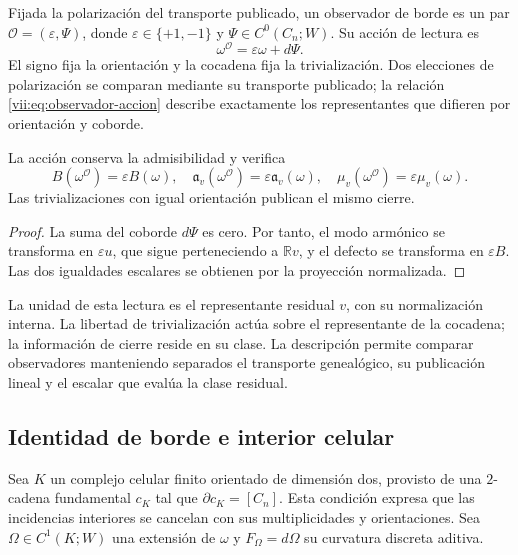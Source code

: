 \begin{definition}
\label{vii:def:observador-borde}
Fijada la polarización del transporte publicado, un observador de borde
es un par \(\mathcal O=(\varepsilon,\Psi)\), donde
\(\varepsilon\in\{+1,-1\}\) y \(\Psi\in C^0(C_n;W)\).
Su acción de lectura es
\begin{equation}
 \omega^{\mathcal O}=\varepsilon\omega+d\Psi.
 \label{vii:eq:observador-accion}
\end{equation}
El signo fija la orientación y la cocadena fija la trivialización.
Dos elecciones de polarización se comparan mediante su transporte
publicado; la relación \eqref{vii:eq:observador-accion} describe
exactamente los representantes que difieren por orientación y coborde.
\end{definition}

\begin{proposition}
\label{vii:prop:observador-covarianza}
La acción conserva la admisibilidad y verifica
\[
 B(\omega^{\mathcal O})=\varepsilon B(\omega),\quad
 \mathfrak a_v(\omega^{\mathcal O})=\varepsilon\mathfrak a_v(\omega),
 \quad \mu_v(\omega^{\mathcal O})=\varepsilon\mu_v(\omega).
\]
Las trivializaciones con igual orientación publican el mismo cierre.
\end{proposition}

\begin{proof}
La suma del coborde \(d\Psi\) es cero. Por tanto, el modo armónico
se transforma en \(\varepsilon u\), que sigue perteneciendo a
\(\mathbb Rv\), y el defecto se transforma en \(\varepsilon B\).
Las dos igualdades escalares se obtienen por la proyección normalizada.
\end{proof}

La unidad de esta lectura es el representante residual \(v\), con su
normalización interna. La libertad de trivialización actúa sobre el
representante de la cocadena; la información de cierre reside en su
clase. La descripción permite comparar observadores manteniendo
separados el transporte genealógico, su publicación lineal y el escalar
que evalúa la clase residual.

\subsection{Identidad de borde e interior celular}
\label{vii:sec:observador-stokes}

Sea \(K\) un complejo celular finito orientado de dimensión dos,
provisto de una \(2\)-cadena fundamental \(c_K\) tal que
\(\partial c_K=[C_n]\). Esta condición expresa que las incidencias
interiores se cancelan con sus multiplicidades y orientaciones.
Sea \(\Omega\in C^1(K;W)\) una extensión de \(\omega\) y
\(F_\Omega=d\Omega\) su curvatura discreta aditiva.

